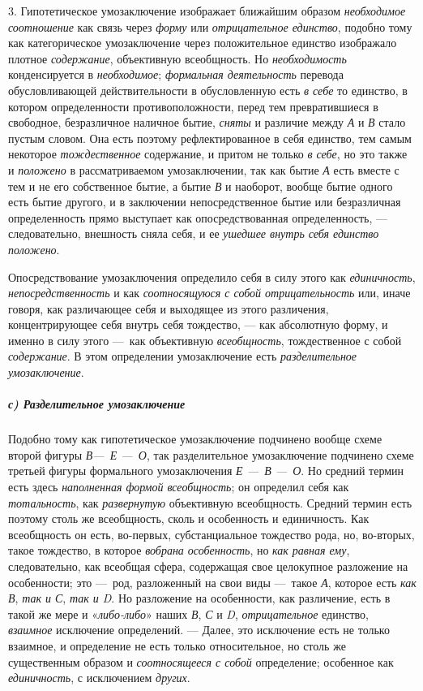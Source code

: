 \documentclass[twoside]{article}
\begin{document}
{{{{{{3. Гипотетическое умозаключение изображает ближайшим образом
{\em необходимое соотношение}
как связь через
{\em форму} или
{\em отрицательное единство},
подобно тому как категорическое умозаключение через
положительное единство изображало плотное
{\em содержание},
объективную всеобщность. Но
{\em необходимость}
конденсируется в
{\em необходимое};
{\em формальная деятельность} 
перевода обусловливающей действительности в обусловленную
есть {\em в себе} то
единство, в котором определенности противоположности, перед тем
превратившиеся в свободное, безразличное наличное бытие,
{\em сняты} и различие
между {\em А} и
{\em В} стало пустым
словом. Она есть поэтому рефлектированное в себя единство,
тем самым некоторое {\em тождественное}
содержание, и притом не только
{\em в себе}, но это
также и {\em положено} в
рассматриваемом умозаключении, так как бытие
{\em А} есть вместе с тем
и не его собственное бытие, а бытие
{\em В} и наоборот,
вообще бытие одного есть бытие другого, и в заключении непосредственное
бытие или безразличная определенность прямо выступает как опосредствованная
определенность, — следовательно, внешность сняла себя, и ее
{\em ушедшее внутрь себя единство
положено}.

Опосредствование умозаключения определило себя в силу этого
как {\em единичность},
{\em непосредственность} и
как {\em соотносящуюся с собой
отрицательность} или, иначе говоря, как различающее себя и
выходящее из этого различения, концентрирующее себя внутрь себя тождество,
— как абсолютную форму, и именно в силу этого
—~как объективную
{\em всеобщность},
тождественное с собой
{\em содержание}. В этом
определении умозаключение есть
{\em разделительное умозаключение}.

\subparagraph[с) Разделительное умозаключение]{с) Разделительное умозаключение}
Подобно тому как гипотетическое умозаключение подчинено вообще
схеме второй фигуры {\em В—~Е —~О}, так разделительное
умозаключение подчинено схеме третьей фигуры формального умозаключения
{\em Е —~В
—~О}. Но средний термин есть здесь
{\em наполненная формой всеобщность};
он определил себя как
{\em тотальность}, как
{\em развернутую}
объективную всеобщность. Средний термин есть поэтому столь же
всеобщность, сколь и особенность и единичность. Как всеобщность он есть,
во-первых, субстанциальное тождество рода, но, во-вторых, такое тождество,
в которое {\em вобрана особенность},
но {\em как равная ему},
следовательно, как всеобщая сфера, содержащая свое целокупное
разложение на особенности; это —~род, разложенный на свои
виды —~такое {\em А},
которое есть {\em как В},
{\em так и С},
{\em так и D}. Но
разложение на особенности, как различение, есть в такой же мере и
«{\em либо-либо}» наших
{\em В},
{\em С} и
{\em D},
{\em отрицательное}
единство, {\em взаимное}
исключение определений. — Далее, это
исключение есть не только взаимное, и определение не есть только
относительное, но столь же существенным образом и
{\em соотносящееся с собой}
определение; особенное как
{\em единичность}, с
исключением {\em других}.

}}}}}}
\end{document}
